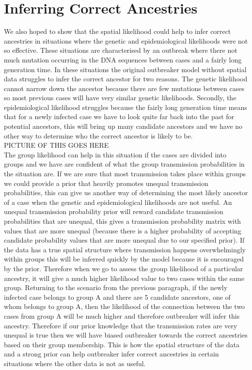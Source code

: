 \documentclass[11pt,a4paper]{report}
\begin{document}
\section{Inferring Correct Ancestries}
We also hoped to show that the spatial likelihood could help to infer correct ancestries in situations where the genetic and epidemiological likelihoods were not so effective. These situations are characterised by an outbreak where there not much mutation occurring in the DNA sequences between cases and a fairly long generation time. In these situations the original outbreaker model without spatial data struggles to infer the correct ancestor for two reasons. The genetic likelihood cannot narrow down the ancestor because there are few mutations between cases so most previous cases will have very similar genetic likelihoods. Secondly, the epidemiological likelihood struggles because the fairly long generation time means that for a newly infected case we have to look quite far back into the past for potential ancestors, this will bring up many candidate ancestors and we have no other way to determine who the correct ancestor is likely to be.
\\
PICTURE OF THIS GOES HERE
\\
The group likelihood can help in this situation if the cases are divided into groups and we have are confident of what the group transmission probabilities in the situation are. If we are sure that most transmission takes place within groups we could provide a prior that heavily promotes unequal transmission probabilities, this can give us another way of determining the most likely ancestor of a case when the genetic and epidemiological likelihoods are not useful.  An unequal transmission probability prior will reward candidate transmission probabilities that are unequal, this gives a transmission probability matrix with values that are more unequal (because there is a higher probability of accepting candidate probability values that are more unequal due to our specified prior). If the data has a true spatial structure where transmission happens overwhelmingly within groups this will be inferred quickly by the model because it is encouraged by the prior. Therefore when we go to assess the group likelihood of a particular ancestry, it will give a much higher likelihood value to two cases within the same group. Returning to the scenario from the previous paragraph, if the newly infected case belongs to group A and there are 5 candidate ancestors, one of whom belongs to group A, then the likelihood of the connection between the two cases from group A will be much higher and therefore outbreaker will infer this ancestry. Therefore if our prior knowledge that the transmission rates are very unequal is true then we will have biased outbreaker towards the correct ancestries based on their group membership. This is how the spatial structure of the data and a strong prior can help outbreaker infer correct ancestries in certain situations where the other data is not as useful.
\end{document}
